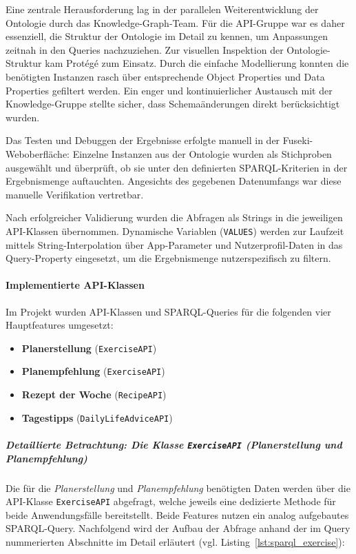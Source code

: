 Eine zentrale Herausforderung lag in der parallelen Weiterentwicklung der Ontologie durch das Knowledge-Graph-Team. Für die API-Gruppe war es daher essenziell, die Struktur der Ontologie im Detail zu kennen, um Anpassungen zeitnah in den Queries nachzuziehen. Zur visuellen Inspektion der Ontologie-Struktur kam Protégé zum Einsatz. Durch die einfache Modellierung konnten die benötigten Instanzen rasch über entsprechende Object Properties und Data Properties gefiltert werden. Ein enger und kontinuierlicher Austausch mit der Knowledge-Gruppe stellte sicher, dass Schemaänderungen direkt berücksichtigt wurden.

Das Testen und Debuggen der Ergebnisse erfolgte manuell in der Fuseki-Weboberfläche: Einzelne Instanzen aus der Ontologie wurden als Stichproben ausgewählt und überprüft, ob sie unter den definierten SPARQL-Kriterien in der Ergebnismenge auftauchten. Angesichts des gegebenen Datenumfangs war diese manuelle Verifikation vertretbar.

Nach erfolgreicher Validierung wurden die Abfragen als Strings in die jeweiligen API-Klassen übernommen. Dynamische Variablen (\texttt{VALUES}) werden zur Laufzeit mittels String-Interpolation über App-Parameter und Nutzerprofil-Daten in das Query-Property eingesetzt, um die Ergebnismenge nutzerspezifisch zu filtern.

\paragraph{Implementierte API-Klassen}

Im Projekt wurden API-Klassen und SPARQL-Queries für die folgenden vier Hauptfeatures umgesetzt:
\begin{itemize}
    \item \textbf{Planerstellung} (\texttt{ExerciseAPI})
    \item \textbf{Planempfehlung} (\texttt{ExerciseAPI})
    \item \textbf{Rezept der Woche} (\texttt{RecipeAPI})
    \item \textbf{Tagestipps} (\texttt{DailyLifeAdviceAPI})
\end{itemize}

\subparagraph{Detaillierte Betrachtung: Die Klasse \texttt{ExerciseAPI} (Planerstellung und Planempfehlung)}

Die für die \textit{Planerstellung} und \textit{Planempfehlung} benötigten Daten werden über die API-Klasse \texttt{ExerciseAPI} abgefragt, welche jeweils eine dedizierte Methode für beide Anwendungsfälle bereitstellt. Beide Features nutzen ein analog aufgebautes SPARQL-Query. Nachfolgend wird der Aufbau der Abfrage anhand der im Query nummerierten Abschnitte im Detail erläutert (vgl. Listing~\ref{lst:sparql_exercise}):


